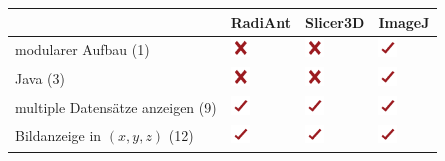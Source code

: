 \begin{table}
    \begin{tabularx}{\textwidth}{|p{7cm}|X|X|X|}
    \toprule
    \hline
    			         							& \textbf{RadiAnt}     								 & \textbf{Slicer3D} 									 & \textbf{ImageJ}\\ \hline
    modularer Aufbau (1)		 					& \includegraphics[width=0.5cm]{./img/no.pdf}	 & \includegraphics[width=0.5cm]{./img/no.pdf}  & \includegraphics[width=0.5cm]{./img/yes.pdf} \\ \hline
    Java (3)	 									& \includegraphics[width=0.5cm]{./img/no.pdf}	 & \includegraphics[width=0.5cm]{./img/no.pdf}  & \includegraphics[width=0.5cm]{./img/yes.pdf}\\ \hline
    multiple Datensätze anzeigen (9)				& \includegraphics[width=0.5cm]{./img/yes.pdf} & \includegraphics[width=0.5cm]{./img/yes.pdf} & \includegraphics[width=0.5cm]{./img/yes.pdf} \\ \hline
    Bildanzeige in $(x, y, z)$ (12)					& \includegraphics[width=0.5cm]{./img/yes.pdf} & \includegraphics[width=0.5cm]{./img/yes.pdf} &  \includegraphics[width=0.5cm]{./img/yes.pdf}\\ \hline

\end{tabularx}
\end{table}

